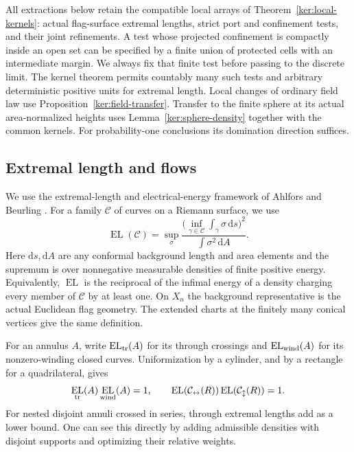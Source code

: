 \documentclass[11pt]{article}
\numberwithin{equation}{section}
\theoremstyle{definition}
\theoremstyle{remark}
\newcommand{\dd}{\mathrm d}
\newcommand{\1}{\mathbf 1}
\DeclareMathOperator{\EL}{EL}
\begin{document}
All extractions below retain the compatible local arrays of
Theorem~\ref{ker:local-kernels}: actual flag-surface extremal lengths,
strict port and confinement tests, and their joint refinements.  A test
whose projected confinement is compactly inside an open set can be
specified by a finite union of protected cells with an intermediate
margin.  We always fix that finite test before passing to the discrete
limit.  The kernel theorem permits countably many such tests and
arbitrary deterministic positive units for extremal length.  Local
changes of ordinary field law use Proposition~\ref{ker:field-transfer}.
Transfer to the finite sphere at its actual area-normalized heights uses
Lemma~\ref{ker:sphere-density} together with the common kernels. For
probability-one conclusions its domination direction suffices.

\subsection{Extremal length and flows}
\label{conf:el-preliminaries}

We use the extremal-length and electrical-energy framework of
Ahlfors and Beurling \cite{AhlforsBeurling1952ConformalInvariants}.
For a family \(\mathcal C\) of curves on a Riemann surface, we use
\begin{equation}
 \EL(\mathcal C)=
 \sup_{\sigma}
 \frac{\bigl(\inf_{\gamma\in\mathcal C}
                 \int_\gamma\sigma\,\dd s\bigr)^2}
      {\int\sigma^2\,\dd A}.
 \label{conf:el-definition}
\end{equation}
Here \(\dd s,\dd A\) are any conformal background length and area
elements and the supremum is over nonnegative measurable densities of
finite positive energy.  Equivalently, \(\EL\) is the reciprocal of
the infimal energy of a density charging every member of \(\mathcal C\)
by at least one.  On \(X_n\) the background representative is the
actual Euclidean flag geometry.  The extended charts at the finitely
many conical vertices give the same definition.

For an annulus \(A\), write \(\EL_{\rm tr}(A)\) for its through
crossings and \(\EL_{\rm wind}(A)\) for its nonzero-winding closed
curves.  Uniformization by a cylinder, and by a rectangle for a
quadrilateral, gives
\begin{equation}
 \EL_{\rm tr}(A)\EL_{\rm wind}(A)=1,
 \qquad
 \EL(\mathcal C_{\leftrightarrow}(R))
 \EL(\mathcal C_{\updownarrow}(R))=1.
 \label{conf:duality}
\end{equation}
For nested disjoint annuli crossed in series, through extremal lengths
add as a lower bound.  One can see this directly by adding admissible
densities with disjoint supports and optimizing their relative weights.
\end{document}
